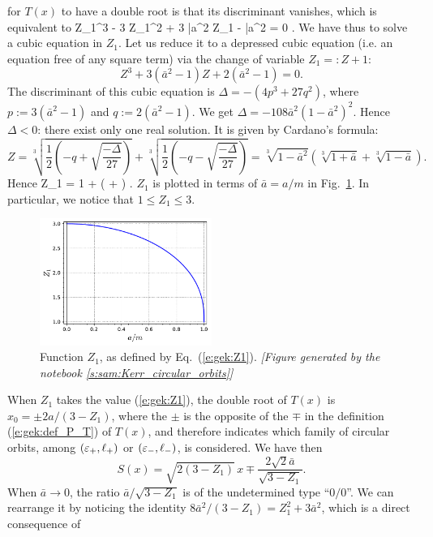 for $T(x)$ to have a double root is that its discriminant vanishes, which is
equivalent to
\be \label{e:gek:cubic_Z1}
  Z_1^3 - 3 Z_1^2 + 3 \bar{a}^2 Z_1 - \bar{a}^2 = 0 .
\ee
We have thus to solve a cubic equation in $Z_1$. Let us reduce it to a depressed
cubic equation (i.e. an equation free of any square term) via the change
of variable $Z_1 =: Z + 1$:
\[
    Z^3 + 3 (\bar{a}^2 - 1) Z + 2 (\bar{a}^2 - 1) = 0 .
\]
The discriminant of this cubic equation is
$\Delta = - (4 p^3 + 27 q^2)$, where $p:= 3 (\bar{a}^2 - 1)$
and $q:=2 (\bar{a}^2 - 1)$. We get $\Delta = - 108 \bar{a}^2 (1 - \bar{a}^2)^2$.
Hence $\Delta < 0$: there exist only one real solution. It is given by
Cardano's formula:
\[
    Z = \sqrt[3]{ \frac{1}{2} \left(-q + \sqrt{\frac{-\Delta}{27}} \right) }
        + \sqrt[3]{ \frac{1}{2} \left(-q - \sqrt{\frac{-\Delta}{27}} \right) }
    = \sqrt[3]{1 - \bar{a}^2} \left( \sqrt[3]{1 + \bar{a}} + \sqrt[3]{1 - \bar{a}} \right) .
\]
Hence
\be \label{e:gek:Z1}
    Z_1 = 1 +  \left(  +  \right) .
\ee
$Z_1$ is plotted in terms of $\bar{a} = a/m$ in Fig.~\ref{f:gek:Z1}.
In particular, we notice that $1 \leq Z_1 \leq 3$.
\begin{figure}
\centerline{\includegraphics[width=0.5\textwidth]{gek_Z1.pdf}}
\caption[]{\label{f:gek:Z1} \footnotesize
Function $Z_1$, as defined by Eq.~(\ref{e:gek:Z1}).
\textsl{[Figure generated by the notebook \ref{s:sam:Kerr_circular_orbits}]}
}
\end{figure}
When $Z_1$ takes the value (\ref{e:gek:Z1}), the double root of $T(x)$ is
$x_0 = \pm {2a}/(3-Z_1)$, where the $\pm$ is the opposite of the $\mp$
in the definition (\ref{e:gek:def_P_T}) of $T(x)$, and therefore indicates
which family of  circular orbits, among $(\varepsilon_+,\ell_+)$ or $(\varepsilon_-,\ell_-)$,
is considered. We have then
\[
    S(x) = \sqrt{2(3-Z_1)} \, x \mp \frac{2\sqrt{2} \bar{a}}{\sqrt{3 - Z_1}} .
\]
When $\bar{a}\to 0$, the ratio $\bar{a}/\sqrt{3 - Z_1}$ is of the undetermined
type ``$0/0$''. We can rearrange it by noticing the identity
${8 \bar{a}^2}/(3 - Z_1) = Z_1^2 + 3 \bar{a}^2$, which is a direct consequence of
